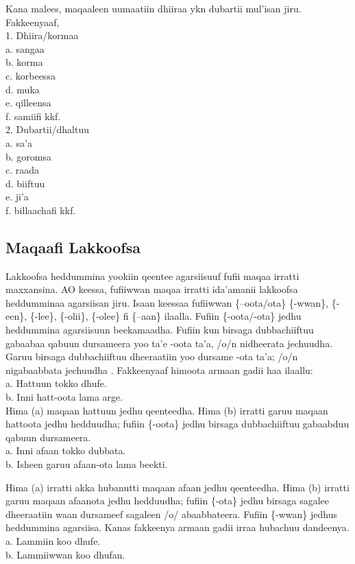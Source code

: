 \documentclass[11pt,b5paper]{book}
\begin{document}
Kana malees, maqaaleen uumaatiin dhiiraa ykn dubartii mul'isan jiru. Fakkeenyaaf,\\
1. Dhiira/kormaa\\
a. sangaa\\
b. korma\\
c. korbeessa\\
d. muka\\
e. qilleensa\\
f. samiifi kkf.\\
2. Dubartii/dhaltuu\\
a. sa'a\\
b. goromsa\\
c. raada\\
d. biiftuu\\
e. ji’a\\
f. billaachafi kkf.

\subsection{Maqaafi Lakkoofsa}

Lakkoofsa heddummina yookiin qeentee agarsiisuuf fufii maqaa irratti maxxansina. AO keessa, fufiiwwan maqaa irratti ida'amanii lakkoofsa heddumminaa agarsiisan jiru. Isaan keessaa fufiiwwan \{–oota/ota\} \{-wwan\}, \{-een\}, \{-lee\}, \{-olii\}, \{-olee\} fi \{–aan\} ilaalla. Fufiin \{-oota/-ota\} jedhu heddummina agarsiisuun beekamaadha\cite{griefenow2001grammatical}. Fufiin kun birsaga dubbachiiftuu gabaabaa qabuun dursameera yoo ta'e {-oota} ta'a, /o/n
nidheerata jechuudha. Garuu birsaga dubbachiiftuu dheeraatiin yoo dursame {-ota} ta'a; /o/n nigabaabbata jechuudha . Fakkeenyaaf himoota armaan gadii haa ilaallu: \\
a. Hattuun tokko dhufe.\\
b. Inni hatt-oota lama arge. \\

Hima (a) maqaan hattuun jedhu qeenteedha. Hima (b) irratti garuu maqaan hattoota jedhu hedduudha; fufiin \{-oota\} jedhu birsaga dubbachiiftuu gabaabduu qabuun dursameera. \\
a. Inni afaan tokko dubbata.\\
b. Isheen garuu afaan-ota lama beekti.

Hima (a) irratti akka hubanutti maqaan afaan jedhu qeenteedha. Hima (b) irratti garuu maqaan afaanota jedhu hedduudha; fufiin \{-ota\} jedhu birsaga sagalee dheeraatiin waan dursameef sagaleen /o/ abaabbateera. Fufiin \{-wwan\} jedhus heddummina agarsiisa. Kanas fakkeenya armaan gadii irraa hubachuu dandeenya. \\
a. Lammiin koo dhufe.\\
b. Lammiiwwan koo dhufan.
\end{document}
